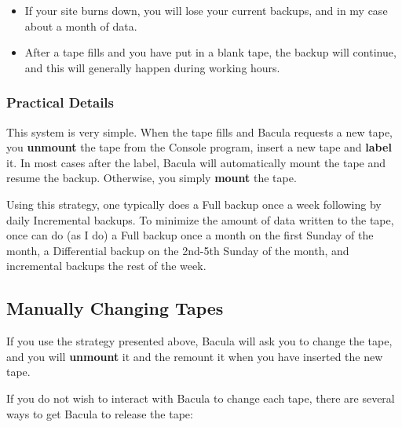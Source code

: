 \begin{itemize}
\item If your site burns down, you will lose your current backups,  and in my
   case about a month of data.  
\item After a tape fills and you have put in a blank tape, the  backup will
   continue, and this will generally happen during  working hours. 
   \end{itemize}

\subsubsection*{Practical Details}

This system is very simple. When the tape fills and Bacula requests a new
tape, you {\bf unmount} the tape from the Console program, insert a new tape
and {\bf label} it. In most cases after the label, Bacula will automatically
mount the tape and resume the backup. Otherwise, you simply {\bf mount} the
tape. 

Using this strategy, one typically does a Full backup once a week following by
daily Incremental backups. To minimize the amount of data written to the tape,
once can do (as I do) a Full backup once a month on the first Sunday of the
month, a Differential backup on the 2nd-5th Sunday of the month, and
incremental backups the rest of the week. 
\label{Manual}

\subsection*{Manually Changing Tapes}

If you use the strategy presented above, Bacula will ask you to change the
tape, and you will {\bf unmount} it and the remount it when you have inserted
the new tape. 

If you do not wish to interact with Bacula to change each tape, there are
several ways to get Bacula to release the tape: 

